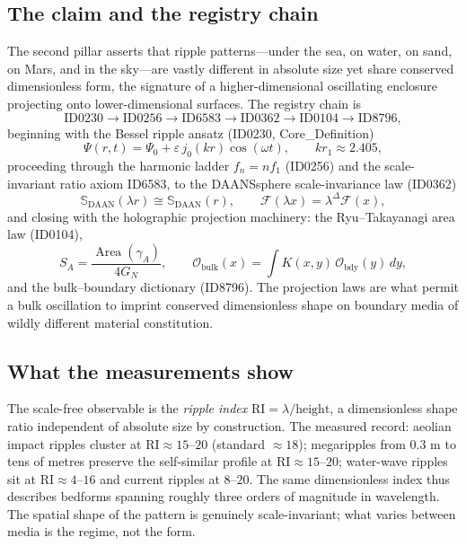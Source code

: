\documentclass[11pt]{article}
\theoremstyle{remark}
\begin{document}
\subsection{The claim and the registry chain}

The second pillar asserts that ripple patterns---under the sea, on water, on sand, on Mars, and in the sky---are vastly different in absolute size yet share conserved dimensionless form, the signature of a higher-dimensional oscillating enclosure projecting onto lower-dimensional surfaces. The registry chain is
\begin{equation*}
\text{ID0230} \to \text{ID0256} \to \text{ID6583} \to \text{ID0362} \to \text{ID0104} \to \text{ID8796},
\end{equation*}
beginning with the Bessel ripple ansatz (ID0230, Core\_Definition)
\begin{equation}
\Psi(r,t) = \Psi_0 + \varepsilon\, j_0(kr)\cos(\omega t), \qquad k r_1 \approx 2.405,
\end{equation}
proceeding through the harmonic ladder $f_n = n f_1$ (ID0256) and the scale-invariant ratio axiom ID6583, to the DAANSsphere scale-invariance law (ID0362)
\begin{equation}
\mathbb{S}_{\mathrm{DAAN}}(\lambda r) \cong \mathbb{S}_{\mathrm{DAAN}}(r), \qquad \mathcal{F}(\lambda x) = \lambda^{\Delta} \mathcal{F}(x),
\end{equation}
and closing with the holographic projection machinery: the Ryu--Takayanagi area law (ID0104),
\begin{equation}
S_A = \frac{\operatorname{Area}(\gamma_A)}{4 G_N}, \qquad \mathcal{O}_{\mathrm{bulk}}(x) = \int K(x,y)\, \mathcal{O}_{\mathrm{bdy}}(y)\, dy,
\end{equation}
and the bulk--boundary dictionary (ID8796). The projection laws are what permit a bulk oscillation to imprint conserved dimensionless shape on boundary media of wildly different material constitution.

\subsection{What the measurements show}

The scale-free observable is the \emph{ripple index} $\mathrm{RI} = \lambda/\mathrm{height}$, a dimensionless shape ratio independent of absolute size by construction. The measured record: aeolian impact ripples cluster at $\mathrm{RI} \approx 15$--$20$ (standard $\approx 18$); megaripples from 0.3 m to tens of metres preserve the self-similar profile at $\mathrm{RI} \approx 15$--$20$; water-wave ripples sit at $\mathrm{RI} \approx 4$--$16$ and current ripples at $8$--$20$. The same dimensionless index thus describes bedforms spanning roughly three orders of magnitude in wavelength. The spatial shape of the pattern is genuinely scale-invariant; what varies between media is the regime, not the form.
\end{document}

